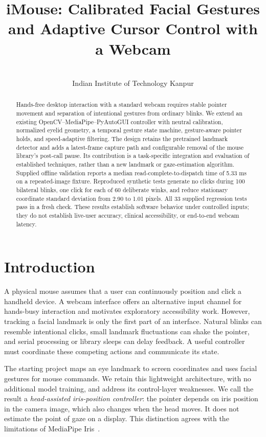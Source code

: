 \documentclass[10pt,twocolumn,letterpaper]{article}
\title{iMouse: Calibrated Facial Gestures and Adaptive Cursor Control with a Webcam}
\author{\TeamAuthors\\Indian Institute of Technology Kanpur\\\CourseName}
\begin{document}
\maketitle
\begin{abstract}
Hands-free desktop interaction with a standard webcam requires stable pointer movement and separation of intentional gestures from ordinary blinks. We extend an existing OpenCV--MediaPipe--PyAutoGUI controller with neutral calibration, normalized eyelid geometry, a temporal gesture state machine, gesture-aware pointer holds, and speed-adaptive filtering. The design retains the pretrained landmark detector and adds a latest-frame capture path and configurable removal of the mouse library's post-call pause. Its contribution is a task-specific integration and evaluation of established techniques, rather than a new landmark or gaze-estimation algorithm. Supplied offline validation reports a median read-complete-to-dispatch time of 5.33 ms on a repeated-image fixture. Reproduced synthetic tests generate no clicks during 100 bilateral blinks, one click for each of 60 deliberate winks, and reduce stationary coordinate standard deviation from 2.90 to 1.01 pixels. All 33 supplied regression tests pass in a fresh check. These results establish software behavior under controlled inputs; they do not establish live-user accuracy, clinical accessibility, or end-to-end webcam latency.
\end{abstract}

\section{Introduction}
A physical mouse assumes that a user can continuously position and click a handheld device. A webcam interface offers an alternative input channel for hands-busy interaction and motivates exploratory accessibility work. However, tracking a facial landmark is only the first part of an interface. Natural blinks can resemble intentional clicks, small landmark fluctuations can shake the pointer, and serial processing or library sleeps can delay feedback. A useful controller must coordinate these competing actions and communicate its state.

The starting project maps an eye landmark to screen coordinates and uses facial gestures for mouse commands. We retain this lightweight architecture, with no additional model training, and address its control-layer weaknesses. We call the result a \emph{head-assisted iris-position controller}: the pointer depends on iris position in the camera image, which also changes when the head moves. It does not estimate the point of gaze on a display. This distinction agrees with the limitations of MediaPipe Iris~\cite{iris}.
\end{document}
